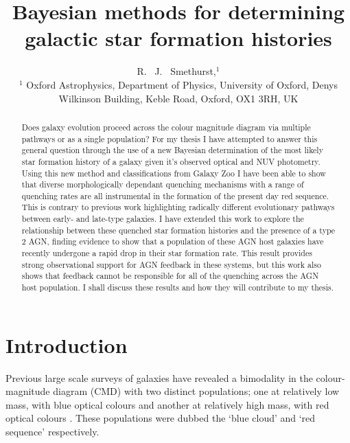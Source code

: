 \documentclass[useAMS,usenatbib]{mn2e}
\begin{document}
\title[]{Bayesian methods for determining galactic star formation histories}
\author[Smethurst 2015]{R. ~J. ~Smethurst,$^{1}$
\\ $^1$ Oxford Astrophysics, Department of Physics, University of Oxford, Denys Wilkinson Building, Keble Road, Oxford, OX1 3RH, UK }

\maketitle

\begin{abstract}

Does galaxy evolution proceed across the colour magnitude diagram via multiple pathways or as a single population? For my thesis I have attempted to answer this general question through the use of a new Bayesian determination of the most likely star formation history of a galaxy given it's observed optical and NUV photometry. Using this new method and classifications from Galaxy Zoo I have been able to show that diverse morphologically dependant quenching mechanisms with a range of quenching rates are all instrumental in the formation of the present day red sequence. This is contrary to previous work highlighting radically different evolutionary pathways between early- and late-type galaxies. I have extended this work to explore the relationship between these quenched star formation histories and the presence of a type 2 AGN, finding evidence to show that a population of these AGN host galaxies have recently undergone a rapid drop in their star formation rate. This result provides strong observational support for AGN feedback in these systems, but this work also shows that feedback cannot be responsible for all of the quenching across the AGN host population. I shall discuss these results and how they will contribute to my thesis. 

\end{abstract}

\section{Introduction}

Previous large scale surveys of galaxies have revealed a bimodality in the colour-magnitude diagram (CMD) with two distinct populations; one at relatively low mass, with blue optical colours and another at relatively high mass, with red optical colours \citep{Baldry04, Baldry06, Willmer06, BLB08, Brammer09}. These populations were dubbed the `blue cloud' and `red sequence' respectively.
\end{document}
